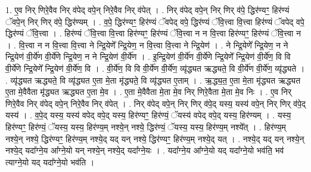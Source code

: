 \documentclass[17pt]{extarticle}
\begin{document}
1. ए॒व निर् णिरे॒वैव निर् व॑पेद् वपे॒न् निरे॒वैव निर् व॑पेत् । . निर् व॑पेद् वपे॒न् निर् णिर् व॑पे॒ द्धिर॑ण्यꣳ॒॒ हिर॑ण्यं ॅवपे॒न् निर् णिर् व॑पे॒ द्धिर॑ण्यम् । . व॒पे॒ द्धिर॑ण्यꣳ॒॒ हिर॑ण्यं ॅवपेद् वपे॒ द्धिर॑ण्यं ॅवि॒त्त्वा वि॒त्त्वा हिर॑ण्यं ॅवपेद् वपे॒ द्धिर॑ण्यं ॅवि॒त्त्वा । . हिर॑ण्यं ॅवि॒त्त्वा वि॒त्त्वा हिर॑ण्यꣳ॒॒ हिर॑ण्यं ॅवि॒त्त्वा न न वि॒त्त्वा हिर॑ण्यꣳ॒॒ हिर॑ण्यं ॅवि॒त्त्वा न । . वि॒त्त्वा न न वि॒त्त्वा वि॒त्त्वा ने न्द्रि॒येणे᳚ न्द्रि॒येण॒ न वि॒त्त्वा वि॒त्त्वा ने न्द्रि॒येण॑ । . ने न्द्रि॒येणे᳚ न्द्रि॒येण॒ न ने न्द्रि॒येण॑ वी॒र्ये॑ण वी॒र्ये॑णे न्द्रि॒येण॒ न ने न्द्रि॒येण॑ वी॒र्ये॑ण । . इ॒न्द्रि॒येण॑ वी॒र्ये॑ण वी॒र्ये॑णे न्द्रि॒येणे᳚ न्द्रि॒येण॑ वी॒र्ये॑ण॒ वि वि वी॒र्ये॑णे न्द्रि॒येणे᳚ न्द्रि॒येण॑ वी॒र्ये॑ण॒ वि । . वी॒र्ये॑ण॒ वि वि वी॒र्ये॑ण वी॒र्ये॑ण॒ व्यृ॑द्ध्यत ऋद्ध्यते॒ वि वी॒र्ये॑ण वी॒र्ये॑ण॒ व्यृ॑द्ध्यते । . व्यृ॑द्ध्यत ऋद्ध्यते॒ वि व्यृ॑द्ध्यत ए॒ता मे॒ता मृ॑द्ध्यते॒ वि व्यृ॑द्ध्यत ए॒ताम् । . ऋ॒द्ध्य॒त॒ ए॒ता मे॒ता मृ॑द्ध्यत ऋद्ध्यत ए॒ता मे॒वैवैता मृ॑द्ध्यत ऋद्ध्यत ए॒ता मे॒व । . ए॒ता मे॒वैवैता मे॒ता मे॒व निर् णिरे॒वैता मे॒ता मे॒व निः । . ए॒व निर् णिरे॒वैव निर् व॑पेद् वपे॒न् निरे॒वैव निर् व॑पेत् । . निर् व॑पेद् वपे॒न् निर् णिर् व॑पे॒द् यस्य॒ यस्य॑ वपे॒न् निर् णिर् व॑पे॒द् यस्य॑ । . व॒पे॒द् यस्य॒ यस्य॑ वपेद् वपे॒द् यस्य॒ हिर॑ण्यꣳ॒॒ हिर॑ण्यं॒ ॅयस्य॑ वपेद् वपे॒द् यस्य॒ हिर॑ण्यम् । . यस्य॒ हिर॑ण्यꣳ॒॒ हिर॑ण्यं॒ ॅयस्य॒ यस्य॒ हिर॑ण्य॒म् नश्ये॒न् नश्ये॒ द्धिर॑ण्यं॒ ॅयस्य॒ यस्य॒ हिर॑ण्य॒म् नश्ये᳚त् । . हिर॑ण्य॒म् नश्ये॒न् नश्ये॒ द्धिर॑ण्यꣳ॒॒ हिर॑ण्य॒म् नश्ये॒द् यद् यन् नश्ये॒ द्धिर॑ण्यꣳ॒॒ हिर॑ण्य॒म् नश्ये॒द् यत् । . नश्ये॒द् यद् यन् नश्ये॒न् नश्ये॒द् यदा᳚ग्ने॒य आ᳚ग्ने॒यो यन् नश्ये॒न् नश्ये॒द् यदा᳚ग्ने॒यः । . यदा᳚ग्ने॒य आ᳚ग्ने॒यो यद् यदा᳚ग्ने॒यो भव॑ति॒ भव॑ त्याग्ने॒यो यद् यदा᳚ग्ने॒यो भव॑ति । \newline
\end{document}
